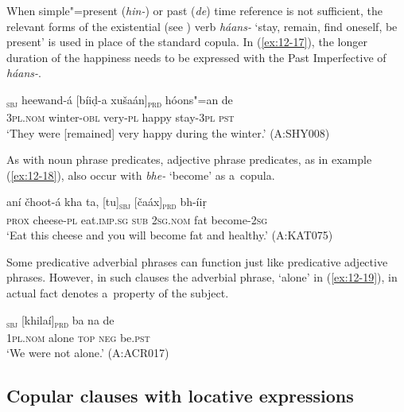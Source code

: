 When simple"=present (\textit{hin-}) or past (\textit{de}) time reference is not sufficient, the relevant forms of the existential (see ) verb \textit{háans-} `stay, remain, find oneself, be present' is used in place of the standard copula. In (\ref{ex:12-17}), the longer duration of the happiness needs to be expressed with the Past Imperfective of \textit{háans-}.

\begin{exe}
\ex
\label{ex:12-17}
\gll [se]\textsubscript{\textsc{sbj}} heewand-á [bíiḍ-a xušaán]\textsubscript{\textsc{prd}} hóons"=an de \\
\textsc{3pl.nom} winter-\textsc{obl} very-\textsc{pl} happy stay-\textsc{3pl} \textsc{pst} \\
\glt `They were [remained] very happy during the winter.' (A:SHY008)
\end{exe}

As with noun phrase predicates, adjective phrase predicates, as in example (\ref{ex:12-18}), also occur with \textit{bhe-} `become' as a~copula.

\begin{exe}
\ex
\label{ex:12-18}
\gll aní čhoot-á kha ta, [tu]\textsubscript{\textsc{sbj}} [čaáx]\textsubscript{\textsc{prd}} bh-íiṛ \\
\textsc{prox} cheese-\textsc{pl} eat.\textsc{imp.sg} \textsc{sub} \textsc{2sg.nom} fat become-\textsc{2sg} \\
\glt `Eat this cheese and you will become fat and healthy.' (A:KAT075)
\end{exe}

Some predicative adverbial phrases can function just like predicative adjective phrases. However, in such clauses the adverbial phrase, `alone' in (\ref{ex:12-19}), in actual fact denotes a~property of the subject.

\begin{exe}
\ex
\label{ex:12-19}
\gll [be]\textsubscript{\textsc{sbj}} [khilaí]\textsubscript{\textsc{prd}} ba na de \\
\textsc{1pl.nom} alone \textsc{top} \textsc{neg} be.\textsc{pst} \\
\glt `We were not alone.' (A:ACR017)
\end{exe}


\subsection{Copular clauses with locative expressions}
\label{subsec:12-1-3}

